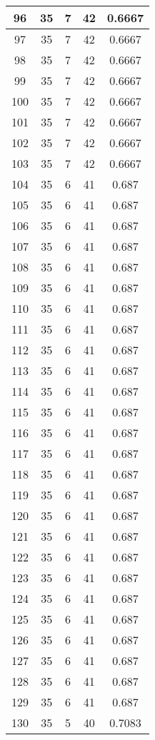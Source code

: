 \documentclass[letterpaper, 12pt]{article}
\begin{document}
\begin{longtable}{|c|c|c|c|c|}
\hline
96 & 35 & 7 & 42 & 0.6667 \\
\hline
97 & 35 & 7 & 42 & 0.6667 \\
\hline
98 & 35 & 7 & 42 & 0.6667 \\
\hline
99 & 35 & 7 & 42 & 0.6667 \\
\hline
100 & 35 & 7 & 42 & 0.6667 \\
\hline
101 & 35 & 7 & 42 & 0.6667 \\
\hline
102 & 35 & 7 & 42 & 0.6667 \\
\hline
103 & 35 & 7 & 42 & 0.6667 \\
\hline
104 & 35 & 6 & 41 & 0.687 \\
\hline
105 & 35 & 6 & 41 & 0.687 \\
\hline
106 & 35 & 6 & 41 & 0.687 \\
\hline
107 & 35 & 6 & 41 & 0.687 \\
\hline
108 & 35 & 6 & 41 & 0.687 \\
\hline
109 & 35 & 6 & 41 & 0.687 \\
\hline
110 & 35 & 6 & 41 & 0.687 \\
\hline
111 & 35 & 6 & 41 & 0.687 \\
\hline
112 & 35 & 6 & 41 & 0.687 \\
\hline
113 & 35 & 6 & 41 & 0.687 \\
\hline
114 & 35 & 6 & 41 & 0.687 \\
\hline
115 & 35 & 6 & 41 & 0.687 \\
\hline
116 & 35 & 6 & 41 & 0.687 \\
\hline
117 & 35 & 6 & 41 & 0.687 \\
\hline
118 & 35 & 6 & 41 & 0.687 \\
\hline
119 & 35 & 6 & 41 & 0.687 \\
\hline
120 & 35 & 6 & 41 & 0.687 \\
\hline
121 & 35 & 6 & 41 & 0.687 \\
\hline
122 & 35 & 6 & 41 & 0.687 \\
\hline
123 & 35 & 6 & 41 & 0.687 \\
\hline
124 & 35 & 6 & 41 & 0.687 \\
\hline
125 & 35 & 6 & 41 & 0.687 \\
\hline
126 & 35 & 6 & 41 & 0.687 \\
\hline
127 & 35 & 6 & 41 & 0.687 \\
\hline
128 & 35 & 6 & 41 & 0.687 \\
\hline
129 & 35 & 6 & 41 & 0.687 \\
\hline
130 & 35 & 5 & 40 & 0.7083 \\

\end{longtable}
\end{document}

